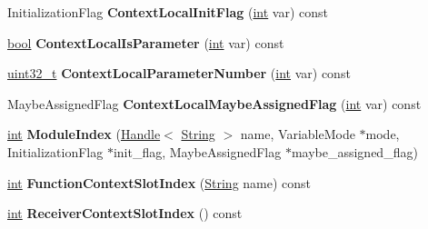 \begin{DoxyCompactItemize}
\mbox{\label{classv8_1_1internal_1_1ScopeInfo_ad4dd7186ebcf76b891ac3252596cd594}} 
Initialization\+Flag {\bfseries Context\+Local\+Init\+Flag} (\mbox{\hyperlink{classint}{int}} var) const
\item 
\mbox{\label{classv8_1_1internal_1_1ScopeInfo_af3e15463034e1ff206f17756e7b45488}} 
\mbox{\hyperlink{classbool}{bool}} {\bfseries Context\+Local\+Is\+Parameter} (\mbox{\hyperlink{classint}{int}} var) const
\item 
\mbox{\label{classv8_1_1internal_1_1ScopeInfo_a02bc80cdccd2f4ae3de2a15e20558ba9}} 
\mbox{\hyperlink{classuint32__t}{uint32\+\_\+t}} {\bfseries Context\+Local\+Parameter\+Number} (\mbox{\hyperlink{classint}{int}} var) const
\item 
\mbox{\label{classv8_1_1internal_1_1ScopeInfo_af0a462efc68c19d56b545dfd403ada80}} 
Maybe\+Assigned\+Flag {\bfseries Context\+Local\+Maybe\+Assigned\+Flag} (\mbox{\hyperlink{classint}{int}} var) const
\item 
\mbox{\label{classv8_1_1internal_1_1ScopeInfo_ac3660e9a1080334aeaad79fe0674a169}} 
\mbox{\hyperlink{classint}{int}} {\bfseries Module\+Index} (\mbox{\hyperlink{classv8_1_1internal_1_1Handle}{Handle}}$<$ \mbox{\hyperlink{classv8_1_1internal_1_1String}{String}} $>$ name, Variable\+Mode $\ast$mode, Initialization\+Flag $\ast$init\+\_\+flag, Maybe\+Assigned\+Flag $\ast$maybe\+\_\+assigned\+\_\+flag)
\item 
\mbox{\label{classv8_1_1internal_1_1ScopeInfo_aa2d0d01f5befe3bbb37bd697ae34b74e}} 
\mbox{\hyperlink{classint}{int}} {\bfseries Function\+Context\+Slot\+Index} (\mbox{\hyperlink{classv8_1_1internal_1_1String}{String}} name) const
\item 
\mbox{\label{classv8_1_1internal_1_1ScopeInfo_ae78dfdf90d218265a3a99def1adf05fa}} 
\mbox{\hyperlink{classint}{int}} {\bfseries Receiver\+Context\+Slot\+Index} () const
\item 
\mbox{\label{classv8_1_1internal_1_1ScopeInfo_a793e7847652602e194df8b5840107cc6}} 

\end{DoxyCompactItemize}
